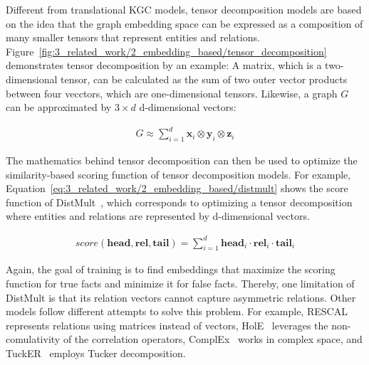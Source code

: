 Different from translational KGC models, tensor decomposition models are based on the idea that the graph embedding space can be expressed as a composition of many smaller tensors that represent entities and relations. Figure~\ref{fig:3_related_work/2_embedding_based/tensor_decomposition} demonstrates tensor decomposition by an example: A matrix, which is a two-dimensional tensor, can be calculated as the sum of two outer vector products between four vecctors, which are one-dimensional tensors. Likewise, a graph $G$ can be approximated by $3 \times d$ d-dimensional vectors:

\begin{align}
    G \approx \sum_{i=1}^{d} \textbf{x}_i \otimes \textbf{y}_i \otimes \textbf{z}_i
    \label{eq:3_related_work/2_embedding_based/tensor_decomposition}
\end{align}

The mathematics behind tensor decomposition can then be used to optimize the similarity-based scoring function of tensor decomposition models. For example, Equation~\ref{eq:3_related_work/2_embedding_based/distmult} shows the score function of DistMult~\cite{Yang2015EmbeddingEA}, which corresponds to optimizing a tensor decomposition where entities and relations are represented by d-dimensional vectors.

\begin{align}
    score(\textbf{head}, \textbf{rel}, \textbf{tail}) = \sum_{i=1}^{d} \textbf{head}_i \cdot \textbf{rel}_i \cdot \textbf{tail}_i
    \label{eq:3_related_work/2_embedding_based/distmult}
\end{align}

Again, the goal of training is to find embeddings that maximize the scoring function for true facts and minimize it for false facts. Thereby, one limitation of DistMult is that its relation vectors cannot capture asymmetric relations. Other models follow different attempts to solve this problem. For example, RESCAL~\cite{Nickel2013TensorFF} represents relations using matrices instead of vectors, HolE~\cite{Nickel2016HolographicEO} leverages the non-comulativity of the correlation operators, ComplEx~\cite{Trouillon2016ComplexEF} works in complex space, and TuckER~\cite{Balazevic2019TuckERTF} employs Tucker decomposition.

